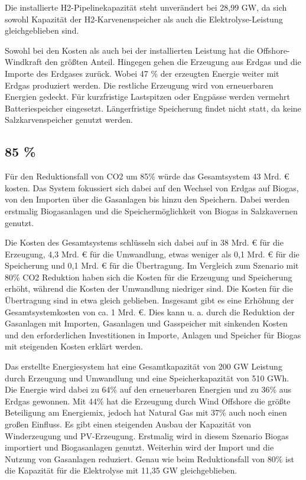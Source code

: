 Die installierte H2-Pipelinekapazität steht unverändert bei 28,99 GW, da sich sowohl Kapazität der H2-Karvenenspeicher als auch die Elektrolyse-Leistung gleichgeblieben sind.

Sowohl bei den Kosten als auch bei der installierten Leistung hat die Offshore-Windkraft den größten Anteil. Hingegen gehen die Erzeugung aus Erdgas und die Importe des Erdgases zurück. Wobei 47 \% der erzeugten Energie weiter mit Erdgas produziert werden. Die restliche Erzeugung wird von erneuerbaren Energien gedeckt. Für kurzfristige Lastspitzen oder Engpässe werden vermehrt Batteriespeicher eingesetzt. Längerfristige Speicherung findet nicht statt, da keine Salzkarvenspeicher genutzt werden.


\subsection{85 \%}
Für den Reduktionsfall von CO2 um 85\% würde das Gesamtsystem 43 Mrd. € kosten. Das System fokussiert sich dabei auf den Wechsel von Erdgas auf Biogas, von den Importen über die Gasanlagen bis hinzu den Speichern. Dabei werden erstmalig Biogasanlagen und die Speichermöglichkeit von Biogas in Salzkavernen genutzt.

Die Kosten des Gesamtsystems schlüsseln sich dabei auf in 38 Mrd. € für die Erzeugung, 4,3 Mrd. € für die Umwandlung, etwas weniger als 0,1 Mrd. € für die Speicherung und 0,1 Mrd. € für die Übertragung.
\newline
Im Vergleich zum Szenario mit 80\% CO2 Reduktion haben sich die Kosten für die Erzeugung und Speicherung erhöht, während die Kosten der Umwandlung niedriger sind. Die Kosten für die Übertragung sind in etwa gleich geblieben. 
Insgesamt gibt es eine Erhöhung der Gesamtsystemkosten von ca. 1 Mrd. €. Dies kann u. a. durch die Reduktion der Gasanlagen mit Importen, Gasanlagen und Gasspeicher mit sinkenden Kosten und den erforderlichen Investitionen in Importe, Anlagen und Speicher für Biogas mit steigenden Kosten erklärt werden.

Das erstellte Energiesystem hat eine Gesamtkapazität von 200 GW Leistung durch Erzeugung und Umwandlung und eine Speicherkapazität von 510 GWh. Die Energie wird dabei zu 64\% auf den erneuerbaren Energien und zu 36\% aus Erdgas gewonnen. Mit 44\% hat die Erzeugung durch Wind Offshore die größte Beteiligung am Energiemix, jedoch hat Natural Gas mit 37\% auch noch einen großen Einfluss.
\newline
Es gibt einen steigenden Ausbau der Kapazität von Winderzeugung und PV-Erzeugung. Erstmalig wird in diesem Szenario Biogas importiert und Biogasanlagen genutzt. Weiterhin wird der Import und die Nutzung von Gasanlagen reduziert.
\newline
Genau wie beim Reduktionsfall von 80\% ist die Kapazität für die Elektrolyse mit 11,35 GW gleichgeblieben.

